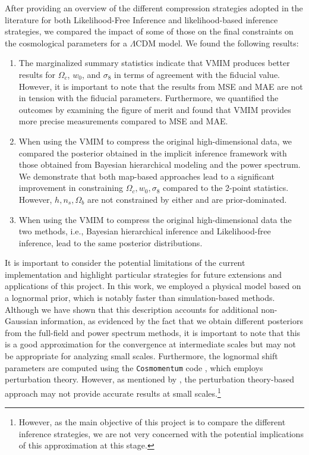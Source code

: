 \documentclass{aa}
\begin{document}
After providing an overview of the different compression strategies adopted in the literature for both Likelihood-Free Inference and likelihood-based inference strategies, we compared the impact of some of those on the final constraints on the cosmological parameters for a $\Lambda$CDM model. 
We found the following results:
\begin{enumerate}
    \item The marginalized summary statistics indicate that VMIM produces better results for $\Omega_c$, $w_0$, and $\sigma_8$ in terms of agreement with the fiducial value. However, it is important to note that the results from MSE and MAE are not in tension with the fiducial parameters.
    Furthermore, we quantified the outcomes by examining the figure of merit and found that VMIM provides more precise measurements compared to MSE and MAE.
    \item When using the VMIM to compress the original high-dimensional data, we compared the posterior obtained in the implicit inference framework with those obtained from Bayesian hierarchical modeling and the power spectrum. We demonstrate that both map-based approaches lead to a significant improvement in constraining $\Omega_c, w_0, \sigma_8$ compared to the 2-point statistics. However, $h, n_s, \Omega_b$ are not constrained by either and are prior-dominated.
    \item When using the VMIM to compress the original high-dimensional data the two methods, i.e., Bayesian hierarchical inference and Likelihood-free inference, lead to the same posterior distributions. 
\end{enumerate}

It is important to consider the potential limitations of the current implementation and highlight particular strategies for future extensions and applications of this project. In this work, we employed a physical model based on a lognormal prior, which is notably faster than simulation-based methods. Although we have shown that this description accounts for additional non-Gaussian information, as evidenced by the fact that we obtain different posteriors from the full-field and power spectrum methods, it is important to note that this is a good approximation for the convergence at intermediate scales but may not be appropriate for analyzing small scales. 
Furthermore, the lognormal shift parameters are computed using the \texttt{Cosmomentum} code \citep{friedrich2018density, friedrich2020primordial}, which employs perturbation theory. However, as mentioned by \citet{boruah2022map}, the perturbation theory-based approach may not provide accurate results at small scales.\footnote{However, as the main objective of this project is to compare the different inference strategies, we are not very concerned with the potential implications of this approximation at this stage.}
\end{document}
